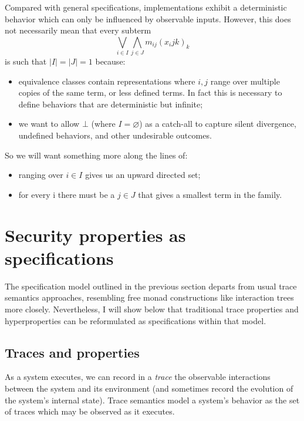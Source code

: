 \documentclass[11pt]{article}
\begin{document}
Compared with general specifications,
implementations exhibit a deterministic behavior
which can only be influenced by observable inputs.
However,
this does not necessarily mean that every subterm
\[
  \bigvee_{i \in I} \bigwedge_{j \in J} m_{ij}(x_ijk)_k
\]
is such that $|I| = |J| = 1$ because:
\begin{itemize}
  \item equivalence classes contain representations where
   $i, j$ range over multiple copies of the same term,
   or less defined terms.
   In fact this is necessary to define behaviors that are
   deterministic but infinite;
  \item we want to allow $\bot$ (where $I = \varnothing$)
    as a catch-all to capture
    silent divergence,
    undefined behaviors,
    and other undesirable outcomes.
\end{itemize}
So we will want something more along the lines of:
\begin{itemize}
  \item ranging over $i \in I$ gives us an upward directed set;
  \item for every i there must be a $j \in J$ that gives a smallest
    term in the family.
\end{itemize}



\section{Security properties as specifications} %

The specification model outlined in the previous section
departs from usual trace semantics approaches,
resembling free monad constructions like interaction trees more closely.
Nevertheless,
I will show below that
traditional trace properties and hyperproperties
can be reformulated as specifications within that model.

\subsection{Traces and properties} %

As a system executes, we can record in a \emph{trace}
the observable interactions between the system and its environment
(and sometimes record the evolution of the system's internal state).
Trace semantics model a system's behavior as
the set of traces which may be observed as it executes.
\end{document}
